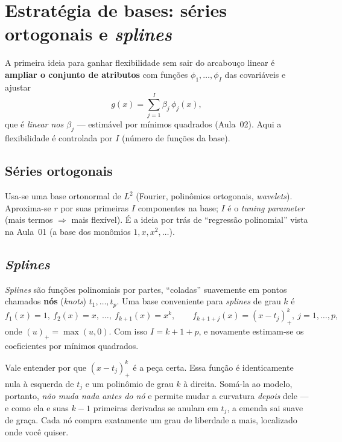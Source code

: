 \documentclass[11pt,a4paper]{article}
\begin{document}
\section{Estratégia de bases: séries ortogonais e \emph{splines}}
A primeira ideia para ganhar flexibilidade sem sair do arcabouço linear é
\textbf{ampliar o conjunto de atributos} com funções $\phi_1,\dots,\phi_I$ das
covariáveis e ajustar
\[
  g(x) = \sum_{j=1}^{I} \beta_j \,\phi_j(x),
\]
que é \emph{linear nos $\beta_j$} --- estimável por mínimos quadrados (Aula~02).
Aqui a flexibilidade é controlada por $I$ (número de funções da base).

\subsection{Séries ortogonais}
Usa-se uma base ortonormal de $L^2$ (Fourier, polinômios ortogonais, \emph{wavelets}).
Aproxima-se $r$ por suas primeiras $I$ componentes na base; $I$ é o \emph{tuning
parameter} (mais termos $\Rightarrow$ mais flexível). É a ideia por trás de
``regressão polinomial'' vista na Aula~01 (a base dos monômios $1,x,x^2,\dots$).

\subsection{\emph{Splines}}
\emph{Splines} são funções polinomiais por partes, ``coladas'' suavemente em
pontos chamados \textbf{nós} (\emph{knots}) $t_1,\dots,t_p$. Uma base conveniente
para \emph{splines} de grau $k$ é
\[
  f_1(x)=1,\ f_2(x)=x,\ \dots,\ f_{k+1}(x)=x^k,\qquad
  f_{k+1+j}(x)=(x-t_j)_+^{k},\ j=1,\dots,p,
\]
onde $(u)_+=\max(u,0)$. Com isso $I=k+1+p$, e novamente estimam-se os
coeficientes por mínimos quadrados.

\begin{ideia}
Vale entender por que $(x-t_j)_+^k$ é a peça certa. Essa função é identicamente
nula à esquerda de $t_j$ e um polinômio de grau $k$ à direita. Somá-la ao modelo,
portanto, \emph{não muda nada antes do nó} e permite mudar a curvatura
\emph{depois} dele --- e como ela e suas $k-1$ primeiras derivadas se anulam em
$t_j$, a emenda sai suave de graça. Cada nó compra exatamente um grau de liberdade
a mais, localizado onde você quiser.
\end{ideia}
\end{document}
